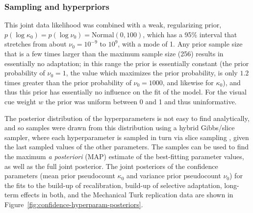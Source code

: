 \subsubsection{Sampling and hyperpriors}
\label{sec:sampl-hyperp-priors}

This joint data likelihood was combined with a weak, regularizing prior, $p(\log \kappa_0) = p(\log \nu_0) = \mathrm{Normal}(0, 100)$, which has a 95\% interval that stretches from about $\nu_0=10^{-9}$ to $10^{9}$, with a mode of 1.  Any prior sample size that is a few times larger than the maximum sample size (256) results in essentially no adaptation; in this range the prior is essentially constant (the prior probability of $\nu_0 = 1$, the value which maximizes the prior probability, is only $1.2$ times greater than the prior probability of $\nu_0=1000$, and likewise for $\kappa_0$), and thus this prior has essentially no influence on the fit of the model.  For the visual cue weight $w$ the prior was uniform between 0 and 1 and thus uninformative.

The posterior distribution of the hyperparameters is not easy to find analytically, and so samples were drawn from this distribution using a hybrid Gibbs/slice sampler, where each hyperparameter is sampled in turn via slice sampling \cite{Neal2003}, given the last sampled values of the other parameters.  The samples can be used to find the maximum \emph{a posteriori} (MAP) estimate of the best-fitting parameter values, as well as the full joint posterior.  The joint posteriors of the confidence parameters (mean prior pseudocount $\kappa_0$ and variance prior pseudocount $\nu_0$) for the fits to the build-up of recalibration, build-up of selective adaptation, long-term effects in both, and the Mechanical Turk replication data are shown in Figure~\ref{fig:confidence-hyperparam-posteriors}.

